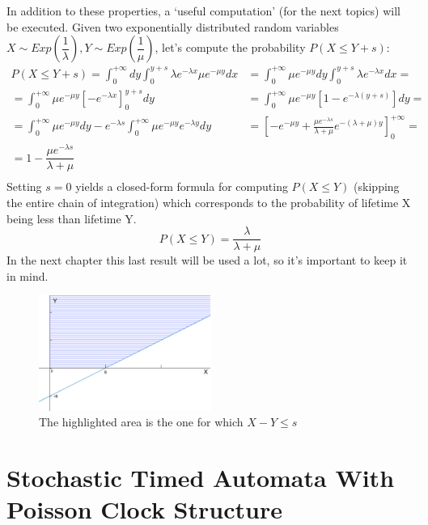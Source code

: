 \documentclass[12pt,a4paper]{article}
\begin{document}
\noindent
In addition to these properties, a `useful computation' (for the next topics) will be executed. Given two exponentially distributed random variables $X\sim Exp\left(\dfrac{1}{\lambda}\right),Y\sim Exp\left(\dfrac{1}{\mu}\right)$, let's compute the probability $P(X \leq Y+s)$:
\begin{align*}
P(X \leq Y+s) = \int_{0}^{+\infty}dy\int_{0}^{y+s}\lambda e^{-\lambda x}\mu e^{-\mu y}dx
&= \int_{0}^{+\infty}\mu e^{-\mu y}dy\int_{0}^{y+s}\lambda e^{-\lambda x}dx = 
\\
=\int_{0}^{+\infty}\mu e^{-\mu y}\left[ -e^{-\lambda x}\right]_0^{y+s}dy
&= \int_{0}^{+\infty}\mu e^{-\mu y}\left[ 1-e^{-\lambda(y+s)}\right]dy =
\\
= \int_{0}^{+\infty}\mu e^{-\mu y}dy - e^{-\lambda s}\int_{0}^{+\infty}\mu e^{-\mu y} e^{-\lambda y}dy
&= \left[-e^{-\mu y} + \frac{\mu e^{-\lambda s}}{\lambda + \mu}e^{-(\lambda+\mu)y}\right]_{0}^{+\infty} =
\\
= 1-\dfrac{\mu e^{-\lambda s}}{\lambda + \mu} \\
\end{align*}
Setting $s=0$ yields a closed-form formula for computing $P(X\leq Y)$ (skipping the entire chain of integration) which corresponds to the probability of lifetime X being less than lifetime Y.
\begin{equation}
\label{eq:xlessy}
P(X\leq Y)= \frac{\lambda}{\lambda + \mu}
\end{equation}
In the next chapter this last result will be used a lot, so it's important to keep it in mind.
\begin{figure}[H]
\begin{center}
\includegraphics[width=0.5\textwidth]{IMG/CommArea2.eps}
\caption{The highlighted area is the one for which $X-Y\leq s$}
\label{Picture 2}
\end{center}
\end{figure}
\newpage
\section{Stochastic Timed Automata With Poisson Clock Structure}
\label{sec:STAWPCS}
\end{document}
